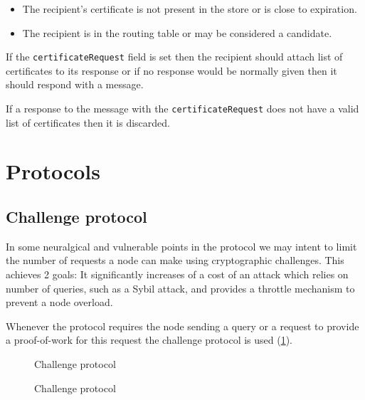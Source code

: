 \begin{itemize}
  \item The recipient's certificate is not present in the store or is close to
    expiration.
  \item The recipient is in the routing table or may be considered a candidate.
\end{itemize}

If the \texttt{certificateRequest} field is set then the recipient should attach
list of certificates to its response or if no response would be normally given
then it should respond with a  message.

If a response to the message with the \texttt{certificateRequest} does not have
a valid list of certificates then it is discarded.

\section{Protocols}
\subsection{Challenge protocol}
In some neuralgical and vulnerable points in the protocol we may intent to limit
the number of requests a node can make using cryptographic challenges. This
achieves 2 goals: It significantly increases of a cost of an attack which relies
on number of queries, such as a Sybil attack, and provides a throttle mechanism
to prevent a node overload.

Whenever the protocol requires the node sending a query or a request to provide
a proof-of-work for this request the challenge protocol is used
(\ref{fig:chal_prot}).

\begin{figure}
\begin{msc}{Challenge protocol}
\setlength{\instdist}{9cm}
\setlength{\envinstdist}{3cm}
\nextlevel
{}
\nextlevel[11]
\nextlevel[1]
\nextlevel[4]
\nextlevel
{}
\nextlevel[4]
\end{msc}
  \caption{Challenge protocol}
  \label{fig:chal_prot}
\end{figure}

